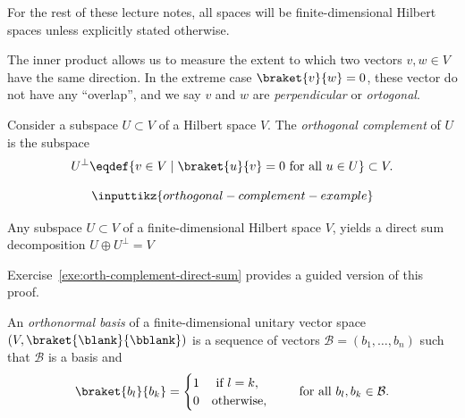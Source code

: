 \documentclass[a4paper,oneside, 12pt]{amsart}
\begin{document}
\begin{convention}
  For the rest of these lecture notes, all spaces will be finite-dimensional Hilbert spaces unless explicitly stated otherwise.
\end{convention}

The inner product allows us to measure the extent to which two vectors \(v, w \in V\) have the same direction.
In the extreme case \(\braket{v}{w} =0\), these vector do not have any ``overlap'', and we say \(v\) and \(w\) are \emph{perpendicular} or \emph{ortogonal}.

\begin{definition}\label{def:orthogonal-complement}
  Consider a subspace \(U\subset V\) of a Hilbert space \(V\).
  The \emph{orthogonal complement} of \(U\) is the subspace
  \begin{equation}
    U^{\perp} \eqdef\{v \in V \mid \braket{u}{v} = 0 \text{ for all }u\in U \} \subset V.
  \end{equation}
\end{definition}

\begin{equation*}
  \inputtikz{orthogonal-complement-example}
\end{equation*}

\begin{proposition}\label{prop:orthogonal-complement-direct-sum}
  Any subspace \(U \subset V\) of a finite-dimensional Hilbert space \(V\), yields a direct sum decomposition \(U \oplus U^{\perp} = V\)
\end{proposition}
Exercise~\ref{exe:orth-complement-direct-sum} provides a guided version of this proof.

\begin{definition}\label{def:orthonormal-basis}
  An \emph{orthonormal basis} of a finite-dimensional unitary vector space \((V, \braket{\blank}{\bblank})\) is a sequence of vectors \(\mathcal{B}= (b_{1}, \dots , b_{n})\)  such that \(\mathcal{B}\) is a basis and
  \begin{equation*}
    \braket{b_{l}}{b_{k}}=
    \begin{cases}
      1 & \text{ if } l = k, \\
      0 & \text{otherwise,}
    \end{cases} \qquad \text{ for all } b_{l}, b_{k} \in \mathcal{B}.
  \end{equation*}
\end{definition}
\end{document}
